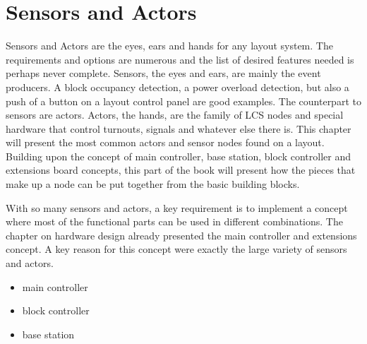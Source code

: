 \chapter{Sensors and Actors}

Sensors and Actors are the eyes, ears and hands for any layout system. The requirements and options are numerous and the list of desired features needed is perhaps never complete. Sensors, the eyes and ears, are mainly the event producers. A block occupancy detection, a power overload detection, but also a push of a button on a layout control panel are good examples. The counterpart to sensors  are actors. Actors, the hands, are the family of LCS nodes and special hardware that control turnouts, signals and whatever else there is. This chapter will present the most common actors and sensor nodes found on a layout. Building upon the concept of main controller, base station, block controller and extensions board concepts, this part of the book will present how the pieces that make up a node can be put together from the basic building blocks.

With so many sensors and actors, a key requirement is to implement a concept where most of the functional parts can be used in different combinations. The chapter on hardware design already presented the main controller and extensions concept. A key reason for this concept were exactly the large variety of sensors and actors.

\begin{itemize}
\item main controller
\item block controller
\item base station
\end{itemize}


